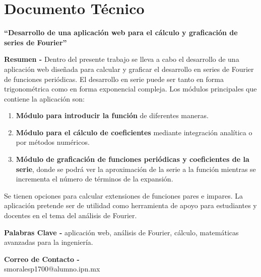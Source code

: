 \chapter{Documento Técnico}
\begin{center}
	\textbf{\Large “Desarrollo de una aplicación web para el cálculo y graficación de series de Fourier”}
	\vspace{0.5cm}
\end{center}

\textbf{Resumen -} Dentro del presente trabajo se lleva a cabo el desarrollo de una aplicación web diseñada para calcular y graficar el desarrollo en series de Fourier de funciones periódicas. El desarrollo en serie puede ser tanto en forma trigonométrica como en forma exponencial compleja. Los módulos principales que contiene la aplicación son:

\begin{enumerate}
	\item \textbf{Módulo para introducir la función} de diferentes maneras.
	\item \textbf{Módulo para el cálculo de coeficientes} mediante integración analítica o por métodos numéricos.
	\item \textbf{Módulo de graficación de funciones periódicas y coeficientes de la serie}, donde se podrá ver la aproximación de la serie a la función mientras se incrementa el número de términos de la expansión.
\end{enumerate}

Se tienen opciones para calcular extensiones de funciones pares e impares. La aplicación pretende ser de utilidad como herramienta de apoyo para estudiantes y docentes en el tema del análisis de Fourier.

\vspace{0.5cm}

\textbf{Palabras Clave -} aplicación web, análisis de Fourier, cálculo, matemáticas avanzadas para la ingeniería.

\vspace{0.5cm}

\textbf{Correo de Contacto -} \\
smoralesp1700@alumno.ipn.mx \\